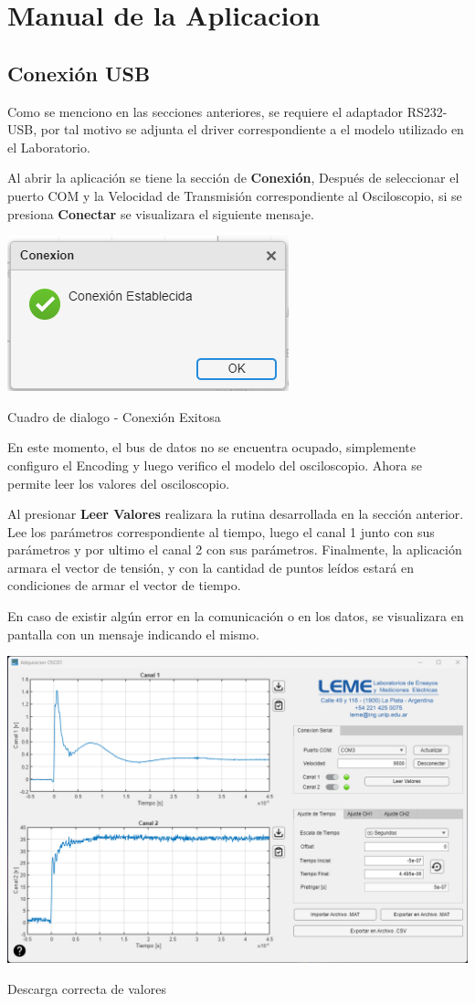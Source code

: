 \chapter{Manual de la Aplicacion}
\section{Conexión USB}
Como se menciono en las secciones anteriores, se requiere el adaptador RS232-USB, por tal motivo se adjunta el driver correspondiente a el modelo utilizado en el Laboratorio.

Al abrir la aplicación se tiene la sección de \textbf{Conexión}, Después de seleccionar el puerto COM y la Velocidad de Transmisión correspondiente al Osciloscopio, si se presiona \textbf{Conectar} se visualizara el siguiente mensaje.


\begin{center}
	\includegraphics[width=0.3\columnwidth]{images/Conexion_Ok}
	\captionsetup{type=figure}
	\caption{Cuadro de dialogo - Conexión Exitosa}
	\label{fig:002}
\end{center}

En este momento, el bus de datos no se encuentra ocupado, simplemente configuro el Encoding y luego verifico el modelo del osciloscopio. Ahora se permite leer los valores del osciloscopio.

Al presionar \textbf{Leer Valores} realizara la rutina desarrollada en la sección anterior. Lee los parámetros correspondiente al tiempo, luego el canal 1 junto con sus parámetros y por ultimo el canal 2 con sus parámetros. Finalmente, la aplicación armara el vector de tensión, y con la cantidad de puntos leídos estará en condiciones de armar el vector de tiempo.

En caso de existir algún error en la comunicación o en los datos, se visualizara en pantalla con un mensaje indicando el mismo.


\begin{center}
	\includegraphics[width=0.7\columnwidth]{images/Datos_Leidos}
	\captionsetup{type=figure}
	\caption{Descarga correcta de valores}
	\label{fig:003}
\end{center}

